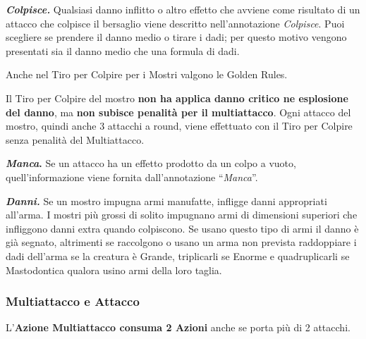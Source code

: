 \begin{multicols}{2}
\emph{\textbf{Colpisce.}} Qualsiasi danno inflitto o altro effetto che avviene come risultato di un attacco che colpisce il bersaglio viene descritto nell'annotazione \emph{Colpisce}. Puoi scegliere se prendere il danno medio o tirare i dadi; per questo motivo vengono presentati sia il danno medio che una formula di dadi.

Anche nel Tiro per Colpire per i Mostri valgono le Golden Rules.

Il Tiro per Colpire del mostro \textbf{non ha applica danno critico ne esplosione del danno}, ma \textbf{non subisce penalità per il multiattacco}. Ogni attacco del mostro, quindi anche 3 attacchi a round, viene effettuato con il Tiro per Colpire senza penalità del Multiattacco.

\textbf{\emph{Manca}.} Se un attacco ha un effetto prodotto da un colpo a vuoto, quell'informazione viene fornita dall'annotazione ``\emph{Manca}''.

\emph{\textbf{Danni.}} Se un mostro impugna armi manufatte, infligge danni appropriati all'arma. I mostri più grossi di solito impugnano armi di dimensioni superiori che infliggono danni extra quando colpiscono. Se usano questo tipo di armi il danno è già segnato, altrimenti se raccolgono o usano un arma non prevista raddoppiare i dadi dell'arma se la creatura è Grande, triplicarli se Enorme e quadruplicarli se Mastodontica qualora usino armi della loro taglia.




\subsubsection{Multiattacco e Attacco}

L'\textbf{Azione Multiattacco consuma 2 Azioni} anche se porta più di 2 attacchi.


\end{multicols}

